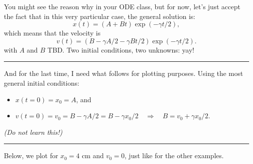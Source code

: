 \documentclass[11pt]{article}
\providecommand{\tightlist}{%
      \setlength{\itemsep}{0pt}\setlength{\parskip}{0pt}}
\begin{document}
    You might see the reason why in your ODE class, but for now, let's just
accept the fact that in this very particular case, the general solution
is: \[ x(t) = (A + Bt)\exp(-\gamma t / 2), \] which means that the
velocity is
\[v(t) = (B - \gamma A/2 - \gamma Bt/2)\exp(-\gamma t / 2). \] with
\(A\) and \(B\) TBD. Two initial conditions, two unknowns: yay!

    \begin{center}\rule{0.5\linewidth}{\linethickness}\end{center}

And for the last time, I need what follows for plotting purposes. Using
the most general initial conditions:

\begin{itemize}
\tightlist
\item
  \(x(t=0) = x_0 = A\), and
\item
  \(v(t=0) = v_0 = B - \gamma A/2 = B - \gamma x_0/2 \quad\Rightarrow \quad B = v_0 + \gamma x_0/2\).
\end{itemize}

\emph{(Do not learn this!)}

\begin{center}\rule{0.5\linewidth}{\linethickness}\end{center}

Below, we plot for \(x_0 = 4\) cm and \(v_0 = 0\), just like for the
other examples.
\end{document}
